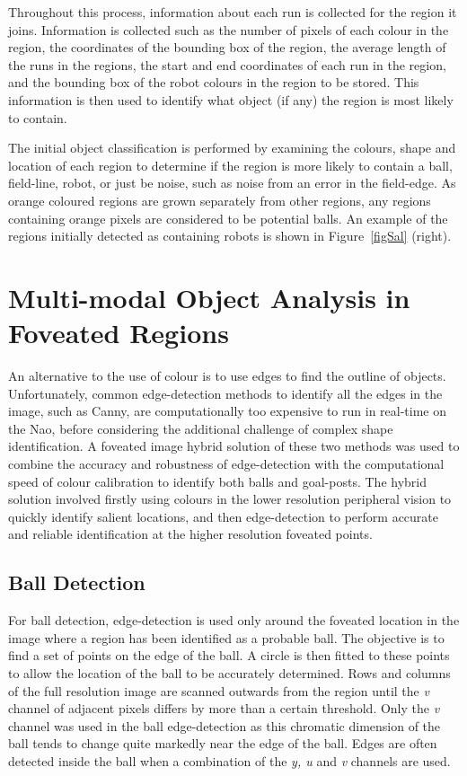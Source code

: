 \documentclass[runningheads,a4paper]{llncs}
\begin{document}
Throughout this process, information about each run is collected for the region it joins. Information is collected such as the number of pixels of each colour in the region, the coordinates of the bounding box of the region, the average length of the runs in the regions, the start and end coordinates of each run in the region, and the bounding box of the robot colours in the region to be stored. This information is then used to identify what object (if any) the region is most likely to contain.

The initial object classification is performed by examining the colours, shape
and location of each region to determine if the region is more likely to contain
a ball, field-line, robot, or just be noise, such as noise from an error in the
field-edge. As orange coloured regions are grown separately from other regions,
any regions containing orange pixels are considered to be potential balls. 
An example of the regions initially detected as containing robots is shown in Figure~\ref{figSal} (right).

\section{Multi-modal Object Analysis in Foveated Regions}
An alternative to the use of colour is to use edges to find the outline of
objects. Unfortunately, common edge-detection methods to identify all the edges
in the image, such as Canny, are computationally too expensive to run in
real-time on the Nao, before considering the additional challenge of complex
shape identification. A foveated image hybrid solution of these two methods was
used to combine the accuracy and robustness of edge-detection with the
computational speed of colour calibration to identify both balls and goal-posts.
The hybrid solution involved firstly using colours in the lower resolution
peripheral vision to quickly identify salient locations, and then edge-detection
to perform accurate and reliable identification at the higher resolution
foveated points.

\subsection{Ball Detection}

For ball detection, edge-detection is used only around the foveated location in
the image where a region has been identified as a probable ball. The objective
is to find a set of points on the edge of the ball. A circle is then fitted to
these points to allow the location of the ball to be accurately determined. Rows
and columns of the full resolution image are scanned outwards from the region
until the \emph{v} channel of adjacent pixels differs by more than a certain
threshold. Only the \emph{v} channel was used in the ball edge-detection as this
chromatic dimension of the ball tends to change quite markedly near the edge of
the ball. Edges are often detected inside the ball when a combination of the
\emph{y, u} and \emph{v} channels are used. 
\end{document}
